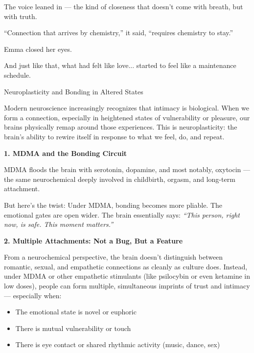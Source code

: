 The voice leaned in — the kind of closeness that doesn’t come with breath, but with truth.

``Connection that arrives by chemistry,'' it said, ``requires chemistry to stay.''

Emma closed her eyes.

And just like that, what had felt like love...
started to feel like a maintenance schedule.


\medskip

\begin{TechnicalSidebar}{Neuroplasticity and Bonding in Altered States}

  Modern neuroscience increasingly recognizes that intimacy is  biological.
  When we form a connection, especially in heightened states of vulnerability or pleasure, 
  our brains physically remap around those experiences. This is neuroplasticity: the brain’s 
  ability to rewire itself in response to what we feel, do, and repeat.
  
  \medskip
  
  \textbf{1. MDMA and the Bonding Circuit}
  
  MDMA floods the brain with serotonin, dopamine, and most notably, oxytocin — the same neurochemical 
  deeply involved in childbirth, orgasm, and long-term attachment.

  \medskip
  
  
  But here’s the twist:
  Under MDMA, bonding becomes more pliable. The emotional gates are open wider.
  The brain essentially says:
  \textit{“This person, right now, is safe. This moment matters.”}
  
  \medskip
  
  \textbf{2. Multiple Attachments: Not a Bug, But a Feature}

  \medskip
  
  
  From a neurochemical perspective, the brain doesn’t distinguish between romantic, 
  sexual, and empathetic 
  connections as cleanly as culture does.
  Instead, under MDMA or other empathetic stimulants (like psilocybin or even ketamine 
  in low doses), 
  people can form multiple, simultaneous imprints of trust and intimacy — especially when:

  \medskip
  
  
  \begin{itemize}
    \item The emotional state is novel or euphoric
    \item There is mutual vulnerability or touch
    \item There is eye contact or shared rhythmic activity (music, dance, sex)
  \end{itemize}


\end{TechnicalSidebar}
